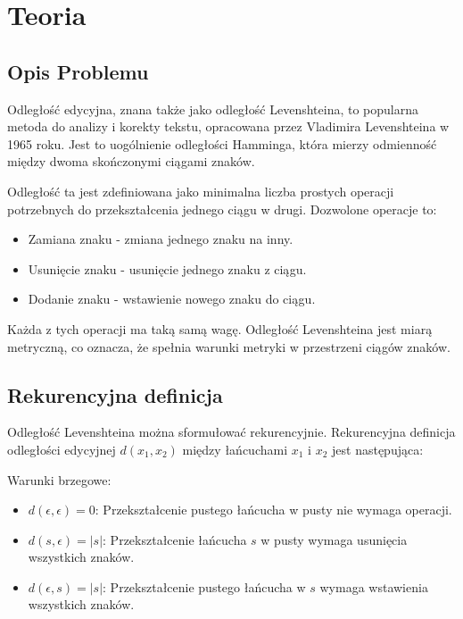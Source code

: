 \section{Teoria}
\subsection{Opis Problemu}
Odległość edycyjna, znana także jako odległość Levenshteina, to popularna metoda do analizy i korekty tekstu, opracowana przez Vladimira Levenshteina w 1965 roku\cite{levenshtein1966}. Jest to uogólnienie odległości Hamminga, która mierzy odmienność między dwoma skończonymi ciągami znaków.

\vspace{1em}

Odległość ta jest zdefiniowana jako minimalna liczba prostych operacji potrzebnych do przekształcenia jednego ciągu w drugi. Dozwolone operacje to:

\begin{itemize}
    \item Zamiana znaku - zmiana jednego znaku na inny.
    \item Usunięcie znaku - usunięcie jednego znaku z ciągu.
    \item Dodanie znaku - wstawienie nowego znaku do ciągu.
\end{itemize}

\vspace{1em}

Każda z tych operacji ma taką samą wagę. Odległość Levenshteina jest miarą metryczną, co oznacza, że spełnia warunki metryki w przestrzeni ciągów znaków. 

\subsection{Rekurencyjna definicja}
Odległość Levenshteina można sformułować rekurencyjnie. Rekurencyjna definicja odległości edycyjnej \(d(x_1, x_2)\) między łańcuchami \(x_1\) i \(x_2\) jest następująca:

\vspace{1em}

Warunki brzegowe:
\begin{itemize}
    \item \(d(\epsilon, \epsilon) = 0\): Przekształcenie pustego łańcucha w pusty nie wymaga operacji.
    \item \(d(s, \epsilon) = |s|\): Przekształcenie łańcucha \(s\) w pusty wymaga usunięcia wszystkich znaków.
    \item \(d(\epsilon, s) = |s|\): Przekształcenie pustego łańcucha w \(s\) wymaga wstawienia wszystkich znaków.
\end{itemize}

